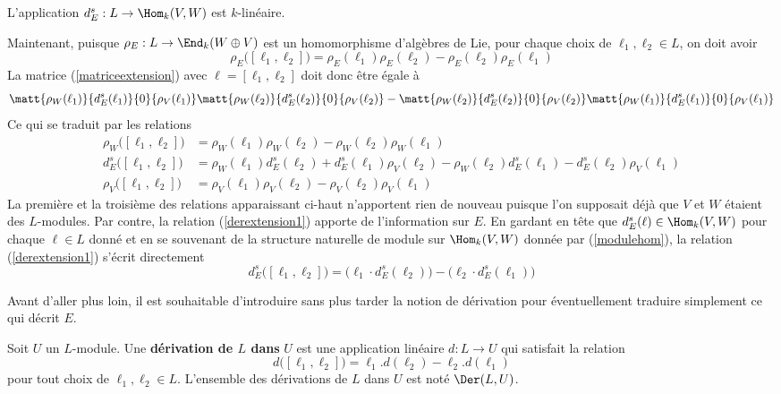 \begin{Rem} L'application $d_E^s : L \rightarrow \Hom_k(V,W)$ est $k$-linéaire.
\end{Rem}

Maintenant, puisque $\rho_E : L \rightarrow \End_k(W \oplus V)$ est un homomorphisme d'algèbres de Lie, pour chaque choix de $\ell_1,\ell_2 \in L$, on doit avoir
$$ \rho_E\big([\ell_1,\ell_2]\big) = \rho_E(\ell_1)\rho_E(\ell_2) - \rho_E(\ell_2)\rho_E(\ell_1) $$
La matrice (\ref{matriceextension}) avec $\ell = [\ell_1,\ell_2]$ doit donc être égale à 
$$ \matt{\rho_W(\ell_1)}{d_E^s(\ell_1)}{0}{\rho_V(\ell_1)}\matt{\rho_W(\ell_2)}{d_E^s(\ell_2)}{0}{\rho_V(\ell_2)} - \matt{\rho_W(\ell_2)}{d_E^s(\ell_2)}{0}{\rho_V(\ell_2)}\matt{\rho_W(\ell_1)}{d_E^s(\ell_1)}{0}{\rho_V(\ell_1)} $$
Ce qui se traduit par les relations
\begin{align}
\rho_W\big([\ell_1,\ell_2]\big) &= \rho_W(\ell_1)\rho_W(\ell_2) - \rho_W(\ell_2)\rho_W(\ell_1) \\
\label{derextension1} d_E^s\big([\ell_1,\ell_2]\big) &= \rho_W(\ell_1)d_E^s(\ell_2) + d_E^s(\ell_1)\rho_V(\ell_2) - \rho_W(\ell_2)d_E^s(\ell_1) - d_E^s(\ell_2)\rho_V(\ell_1)\\
\rho_V\big([\ell_1,\ell_2]\big) &= \rho_V(\ell_1)\rho_V(\ell_2) - \rho_V(\ell_2)\rho_V(\ell_1)
\end{align}
La première et la troisième des relations apparaissant ci-haut n'apportent rien de nouveau puisque l'on supposait déjà que $V$ et $W$ étaient des $L$-modules. Par contre, la relation (\ref{derextension1}) apporte de l'information sur $E$. En gardant en tête que $d_E^s(\ell) \in \Hom_k(V,W)$ pour chaque $\ell \in L$ donné et en se souvenant de la structure naturelle de module sur $\Hom_k(V,W)$ donnée par (\ref{modulehom}), la relation (\ref{derextension1}) s'écrit directement
\begin{equation} \label{derextension2}
d_E^s\big([\ell_1,\ell_2]\big) = \big(\ell_1 \cdot d_E^s(\ell_2)\big) - \big(\ell_2 \cdot d_E^s(\ell_1)\big) 
\end{equation}

Avant d'aller plus loin, il est souhaitable d'introduire sans plus tarder la notion de dérivation pour éventuellement traduire simplement ce qui décrit $E$.

\begin{Def} Soit $U$ un $L$-module. Une \textbf{dérivation de $L$ dans} $U$ est une application linéaire $ d : L \rightarrow U$ qui satisfait la relation
$$ d\big([\ell_1,\ell_2]\big) = \ell_1.d(\ell_2) - \ell_2.d(\ell_1) $$
pour tout choix de $\ell_1,\ell_2 \in L$. L'ensemble des dérivations de $L$ dans $U$ est noté $\Der(L,U)$.
\end{Def}

